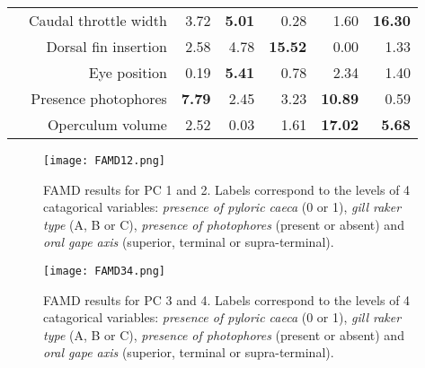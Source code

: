 \begin{table}[!htbp]
\begin{adjustbox}{max width=1.1\textwidth,center}
\begin{tabular}{>{\bfseries}crrrrrr}
  &Caudal throttle width & 3.72 & \textbf{5.01} & 0.28 & 1.60 & \textbf{16.30} \\ 
  &Dorsal fin insertion & 2.58 & 4.78 & \textbf{15.52} & 0.00 & 1.33 \\ 
  \midrule
  \multirow{2}{*}{Habitat} &Eye position & 0.19 & \textbf{5.41} & 0.78 & 2.34 & 1.40 \\ 
  &Presence photophores & \textbf{7.79} & 2.45 & 3.23 & \textbf{10.89} & 0.59 \\
  &Operculum volume & 2.52 & 0.03 & 1.61 & \textbf{17.02} & \textbf{5.68} \\ 
   \bottomrule
\end{tabular}
\end{adjustbox}
\end{table}

\begin{figure} [!htbp]
	\begin{center}
		\texttt{[image: FAMD12.png]}  
	\end{center}
	\caption[FAMD results for first and second axis]{FAMD results for PC 1 and 2. Labels correspond to the levels of 4 catagorical variables: \emph{presence of pyloric caeca} (0 or 1), \emph{gill raker type} (A, B or C), \emph{presence of photophores} (present or absent) and \emph{oral gape axis} (superior, terminal or supra-terminal).}
	\label{fig:famd12}
\end{figure}

\begin{figure} [!htbp]
	\begin{center}
		\texttt{[image: FAMD34.png]}
	\end{center}
	\caption[FAMD results for third and fourth axis]{FAMD results for PC 3 and 4. Labels correspond to the levels of 4 catagorical variables: \emph{presence of pyloric caeca} (0 or 1), \emph{gill raker type} (A, B or C), \emph{presence of photophores} (present or absent) and \emph{oral gape axis} (superior, terminal or supra-terminal).}
	\label{fig:famd34}
\end{figure}
\restoregeometry



